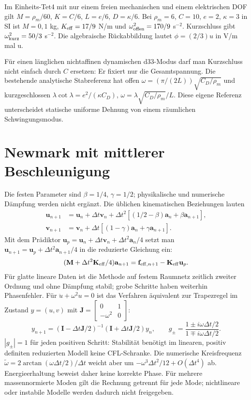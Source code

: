 Im Einheits-Tet4 mit nur einem freien mechanischen und einem elektrischen
DOF gilt $M=\rho_m/60$, $K=C/6$, $L=e/6$, $D=\kappa/6$.
Bei $\rho_m=6$, $C=10$, $e=2$, $\kappa=3$ in SI ist
$M=0{,}1$ kg, $K_{\rm eff}=17/9$ N/m und
$\omega_{\rm offen}^2=170/9$ s$^{-2}$.
Kurzschluss gibt $\omega_{\rm kurz}^2=50/3$ s$^{-2}$.
Die algebraische Rückabbildung lautet $\phi=(2/3)u$ in V/m mal u.

Für einen länglichen nichtaffinen dynamischen d33-Modus darf man Kurzschluss
nicht einfach durch $C$ ersetzen: Er fixiert nur die Gesamtspannung.
Die bestehende analytische Stabreferenz hat offen
$\omega=(\pi/(2L))\sqrt{C_D/\rho_m}$ und kurzgeschlossen
$\lambda\cot\lambda=e^2/(\kappa C_D)$,
$\omega=\lambda\sqrt{C_D/\rho_m}/L$. Diese eigene Referenz unterscheidet
statische uniforme Dehnung von einem räumlichen Schwingungsmodus.

\section{Newmark mit mittlerer Beschleunigung}
Die festen Parameter sind $\beta=1/4$, $\gamma=1/2$; physikalische und
numerische Dämpfung werden nicht ergänzt. Die üblichen kinematischen
Beziehungen \cite{opensees-newmark} lauten
\begin{align}\label{eq:newmark}
\mathbf u_{n+1}&=\mathbf u_n+\Delta t\mathbf v_n+
\Delta t^2[(1/2-\beta)\mathbf a_n+\beta\mathbf a_{n+1}],\\
\mathbf v_{n+1}&=\mathbf v_n+\Delta t[(1-\gamma)\mathbf a_n+
\gamma\mathbf a_{n+1}].\nonumber
\end{align}
Mit dem Prädiktor
$\mathbf u_p=\mathbf u_n+\Delta t\mathbf v_n+\Delta t^2\mathbf a_n/4$
setzt man $\mathbf u_{n+1}=\mathbf u_p+\Delta t^2\mathbf a_{n+1}/4$ in die
reduzierte Gleichung ein:
\begin{equation}\label{eq:newmark-solve}
(\mathbf M+\Delta t^2\mathbf K_{\rm eff}/4)\mathbf a_{n+1}
=\mathbf f_{{\rm eff},n+1}-\mathbf K_{\rm eff}\mathbf u_p.
\end{equation}
Für glatte lineare Daten ist die Methode auf festem Raumnetz zeitlich zweiter
Ordnung und ohne Dämpfung stabil; grobe Schritte haben weiterhin Phasenfehler.
Für $\ddot u+\omega^2u=0$ ist das Verfahren äquivalent zur
Trapezregel im Zustand $y=(u,v)$ mit
$\mathbf J=\left[\begin{smallmatrix}0&1\\-\omega^2&0\end{smallmatrix}\right]$:
\begin{equation}\label{eq:newmark-stability}
y_{n+1}=(\mathbf I-\Delta t\mathbf J/2)^{-1}
(\mathbf I+\Delta t\mathbf J/2)y_n,\qquad
g_\pm=\frac{1\pm i\omega\Delta t/2}{1\mp i\omega\Delta t/2}.
\end{equation}
$|g_\pm|=1$ für jeden positiven Schritt: Stabilität benötigt im linearen,
positiv definiten reduzierten Modell keine CFL-Schranke. Die numerische
Kreisfrequenz $\tilde\omega=2\arctan(\omega\Delta t/2)/\Delta t$
weicht aber um $-\omega^3\Delta t^2/12+O(\Delta t^4)$ ab. Energieerhaltung
beweist daher keine korrekte Phase. Für mehrere massennormierte Moden gilt
die Rechnung getrennt für jede Mode; nichtlineare oder instabile Modelle
werden dadurch nicht freigegeben.


